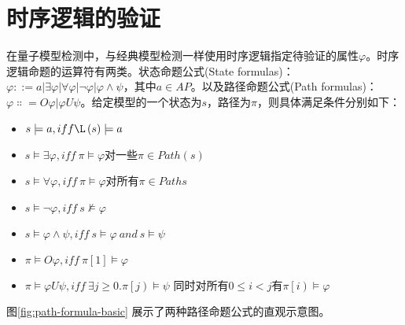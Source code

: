 \section{时序逻辑的验证}
在量子模型检测中，与经典模型检测一样使用时序逻辑指定待验证的属性\(\varphi\)。时序逻辑命题的运算符有两类\citep{goranko_2023}。状态命题公式(State formulas)：\(\varphi ::=a\left|\exists\varphi\right|\forall \varphi\left|\lnot\varphi\right|\varphi\land\psi\)，其中\(a\in AP\)。以及路径命题公式(Path formulas)：\(\varphi\Colon=O\varphi|\varphi U\psi\)。给定模型的一个状态为\(s\)，路径为\(\pi\)，则具体满足条件分别如下：
\begin{itemize}
    \item \(s\models a,iff \L\left(s\right)\models a\)
    \item \(s\models\exists\varphi,iff\ \pi\models\varphi\)对一些\(\pi\in Path\left(s\right)\)
    \item \(s\models\forall\varphi,iff\ \pi\models\varphi\)对所有\(π\in Paths\)
    \item \(s\models\lnot\varphi,iff\ s\nvDash\varphi\)
    \item \(s\models\varphi\land\psi,iff\ s\models\varphi\ and\ s\models\psi\)
    \item \(\pi\models O\varphi,iff\ \pi\left[1\right]\models\varphi\)
    \item \(\pi\models\varphi U\psi,iff\ \exists j\geq0\).\(\pi\left[j\right)\models\psi\) 同时对所有\(0\le i<j\)有\(\pi\left[i\right)\models\varphi\)
\end{itemize}


图\ref{fig:path-formula-basic} 展示了两种路径命题公式的直观示意图。


